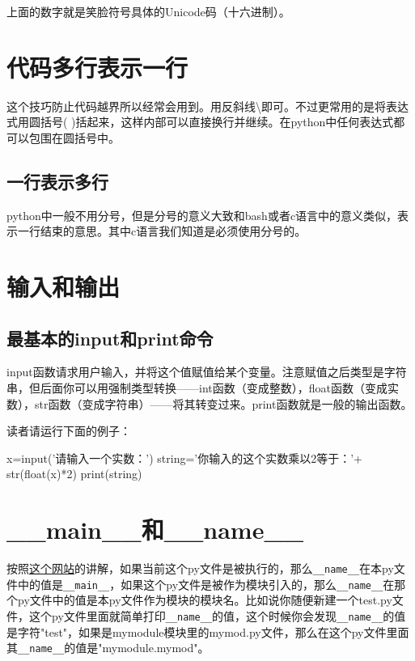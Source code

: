 \documentclass[12pt,oneside]{book}
\begin{document}
\begin{common-format}
上面的数字就是笑脸符号具体的Unicode码（十六进制）。


\section{代码多行表示一行}
这个技巧防止代码越界所以经常会用到。用反斜线\textbackslash 即可。不过更常用的是将表达式用圆括号( )括起来，这样内部可以直接换行并继续。在python中任何表达式都可以包围在圆括号中。

\subsection{一行表示多行}
python中一般不用分号，但是分号的意义大致和bash或者c语言中的意义类似，表示一行结束的意思。其中c语言我们知道是必须使用分号的。



\section{输入和输出}
\subsection{最基本的input和print命令}
input函数请求用户输入，并将这个值赋值给某个变量。注意赋值之后类型是字符串，但后面你可以用强制类型转换——int函数（变成整数），float函数（变成实数），str函数（变成字符串）——将其转变过来。print函数就是一般的输出函数。

读者请运行下面的例子：
\begin{tcbpython}[]
x=input('请输入一个实数：')
string='你输入的这个实数乘以2等于：'+ str(float(x)*2)
print(string)
\end{tcbpython}


\section{\_{}\_{}main\_{}\_{}和\_{}\_{}name\_{}\_{}}
按照\href{http://stackoverflow.com/questions/419163/what-does-if-name-main-do}{这个网站}的讲解，如果当前这个py文件是被执行的，那么\verb+__name__+在本py文件中的值是\verb+__main__+，如果这个py文件是被作为模块引入的，那么\verb+__name__+在那个py文件中的值是本py文件作为模块的模块名。比如说你随便新建一个test.py文件，这个py文件里面就简单打印\verb+__name__+的值，这个时候你会发现\verb+__name__+的值是字符"test"，如果是mymodule模块里的mymod.py文件，那么在这个py文件里面其\verb+__name__+的值是"mymodule.mymod"。




\end{common-format}
\end{document}
